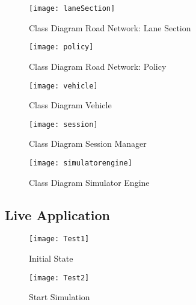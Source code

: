 \documentclass[11pt]{article}
\begin{document}
\begin{enumerate}
\begin{figure}[H]
        \texttt{[image: laneSection]} 
        \centering
        \caption{Class Diagram Road Network: Lane Section} 
        \label{cdlane}
\end{figure}

\begin{figure}[H]
        \texttt{[image: policy]} 
        \centering
        \caption{Class Diagram Road Network: Policy} 
        \label{cdpolicy}
\end{figure}

\begin{figure}[H]
        \texttt{[image: vehicle]} 
        \centering
        \caption{Class Diagram Vehicle} 
        \label{cdvehicle}
\end{figure}

\begin{figure}[H]
        \texttt{[image: session]} 
        \centering
        \caption{Class Diagram Session Manager} 
        \label{cdsessionmanager}
\end{figure}

\begin{figure}[H]
        \texttt{[image: simulatorengine]} 
        \centering
        \caption{Class Diagram Simulator Engine} 
        \label{cdsimulatorengine}
\end{figure}


\subsection{Live Application}
\begin{figure}[H]
        \texttt{[image: Test1]}
        \centering
        \caption{Initial State}
        \label{fig:test1}
\end{figure}
\begin{figure}[H]
        \texttt{[image: Test2]}
        \centering
        \caption{Start Simulation}
        \label{fig:test2}
\end{figure}


\end{enumerate}
\end{document}
